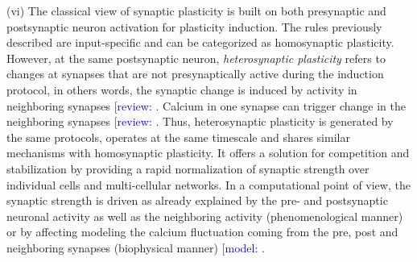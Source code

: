 (vi) The classical view of synaptic plasticity is built on both presynaptic and postsynaptic neuron activation for plasticity induction.  The rules previously described are input-specific and can be categorized as homosynaptic plasticity. However, at the same postsynaptic neuron, \textit{heterosynaptic plasticity} refers to changes at synapses that are not presynaptically active during the induction protocol, in others words, the synaptic change is induced by activity in neighboring synapses [\textcolor{blue}{review:} \cite{meriney_synaptic_2019, timofeev_sleep-wake_2019}.  Calcium in one synapse can trigger change in the neighboring synapses [\textcolor{blue}{review:} \cite{ bannon_homeostatic_2016, chistiakova_heterosynaptic_2014, froemke_plasticity_2015}. Thus, heterosynaptic plasticity is generated by the same protocols, operates at the same timescale and shares similar mechanisms with homosynaptic plasticity. It offers a solution for competition and stabilization by providing a rapid normalization of synaptic strength over individual cells and multi-cellular networks. In a computational point of view, the synaptic strength is driven as already explained by the pre- and postsynaptic neuronal activity as well as the neighboring activity (phenomenological manner) or by affecting modeling the calcium fluctuation coming from the pre, post and neighboring synapses (biophysical manner)  [\textcolor{blue}{model:} \cite{chen_heterosynaptic_2013, field_heterosynaptic_2020, hiratani_detailed_2017, li_induction_2016, fiete_spike-time-dependent_2010}. \\

